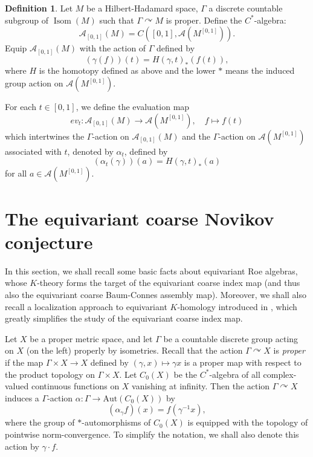 \documentclass[11pt]{article}
\theoremstyle{definition}
\newtheorem{Def}{Definition}[section]
\theoremstyle{plain}
\def\A{\mathcal A}\def\C{\mathcal C}\def\B{\mathcal B}\def\E{\mathcal E}\def\O{\mathcal O}\def\h{\mathfrak h}\def\K{\mathcal K}\def\F{\mathcal F}\def\P{\mathcal P}\def\L{\mathcal L}\def\R{\mathcal R}\def\Q{\mathcal Q}\def\H{\mathcal H}\def\S{\mathcal S}\def\N{\mathcal N}\def\U{\mathcal U}\def\V{\mathcal V}
\def\Ga{\Gamma}
\def\car{\curvearrowright}
\begin{document}
\begin{Def}\label{big algebra}
Let $M$ be a Hilbert-Hadamard space, $\Ga$ a discrete countable subgroup of $\operatorname{Isom}(M)$ such that $\Ga\car M$ is proper. Define the $C^*$-algebra:
$$\A_{[0,1]}(M)=C\left([0,1],\A(M^{[0,1]})\right).$$
Equip $\A_{[0,1]}(M)$ with the action of $\Ga$ defined by
$$(\gamma(f))(t)=H(\gamma,t)_*(f(t)),$$
where $H$ is the homotopy defined as above and the lower $*$ means the induced group action on $\A(M^{[0,1]})$.

For each $t\in [0,1]$, we define the evaluation map
$$ev_t:\A_{[0,1]}(M)\to\A(M^{[0,1]}),\quad f\mapsto f(t)$$
which intertwines the $\Ga$-action on $\A_{[0,1]}(M)$ and the $\Ga$-action on $\A(M^{[0,1]})$ associated with $t$, denoted by $\alpha_t$, defined by
$$(\alpha_t(\gamma))(a)=H(\gamma,t)_*(a)$$
for all $a\in \A(M^{[0,1]})$.
\end{Def}


























\section{The equivariant coarse Novikov conjecture}\label{sec: The equivariant coarse Novikov conjecture}

In this section, we shall recall some basic facts about equivariant Roe algebras, whose $K$-theory forms the target of the equivariant coarse index map (and thus also the equivariant coarse Baum-Connes assembly map). Moreover, we shall also recall a localization approach to equivariant $K$-homology introduced in \cite{Yu1997}, which greatly simplifies the study of the equivariant coarse index map.

Let $X$ be a proper metric space, and let $\Gamma$ be a countable discrete group acting on $X$ (on the left) properly by isometries. Recall that the action $\Gamma\curvearrowright X$ is {\em proper} if the map $\Gamma\times X\to X$ defined by $(\gamma, x)\mapsto \gamma x$ is a proper map with respect to the product topology on $\Gamma\times X$.
Let $C_0(X)$ be the $C^*$-algebra of all complex-valued continuous functions on $X$ vanishing at infinity. Then the action $\Ga\car X$ induces a $\Ga$-action $\alpha:\Ga\to\text{Aut}(C_0(X))$ by
$$(\alpha_{\gamma}f)(x)=f(\gamma^{-1}x),$$
where the group of $*$-automorphisms of $C_0(X)$ is equipped with the topology of pointwise norm-convergence. To simplify the notation, we shall also denote this action by $\gamma\cdot f$.
\end{document}

